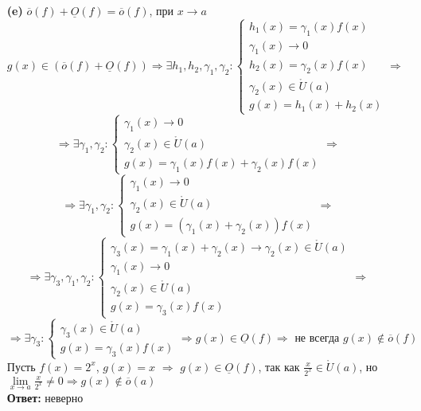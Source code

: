 \documentclass[a4paper]{article}
\renewcommand{\f}[2]{\frac{#1}{#2}}
\newcommand{\case}[1]{\begin{cases} #1 \end{cases}}
\newcommand{\lm}[1]{\underset{#1}{\lim}}
\renewcommand{\r}{\Rightarrow}
\newcommand{\OO}{\underline{O}}
\newcommand{\oo}{\overline{o}}
\begin{document}
\begin{enumerate}
\begin{enumerate}
        \item[\textbf{(e)}]$\oo(f) + \OO(f) = \oo(f)$, при $x \to a$
        $$g(x) \in (\oo(f)+ \OO(f)) \r \exists h_1, h_2, \gamma_1, \gamma_2 : \case{
            h_1(x) = \gamma_1(x)f(x)\\
            \gamma_1(x) \to 0\\
            h_2(x) = \gamma_2(x)f(x)\\
            \gamma_2(x) \in \mathring{U}(a)\\
            g(x) = h_1(x)+h_2(x)
        }\r$$
        $$\r \exists \gamma_1, \gamma_2 : \case{
            \gamma_1(x) \to 0\\
            \gamma_2(x) \in \mathring{U}(a)\\
            g(x) = \gamma_1(x)f(x) + \gamma_2(x)f(x) 
        }\r $$
        $$ \r \exists \gamma_1, \gamma_2 : \case{
            \gamma_1(x) \to 0\\
            \gamma_2(x) \in \mathring{U}(a)\\
            g(x) = (\gamma_1(x) + \gamma_2(x))f(x)
        }\r$$
        $$ \r \exists \gamma_3,\gamma_1, \gamma_2 : \case{
            \gamma_3(x) = \gamma_1(x) + \gamma_2(x) \to \gamma_2(x) \in \mathring{U}(a)\\
            \gamma_1(x) \to 0\\
            \gamma_2(x) \in \mathring{U}(a)\\
            g(x) = \gamma_3(x)f(x)
        } \r$$
        $$\r \exists \gamma_3 : \case{
            \gamma_3(x) \in \mathring{U}(a)\\
            g(x) = \gamma_3(x)f(x)
        } \r g(x) \in \OO(f) \r \text{ не всегда } g(x) \notin \oo(f)$$
        Пусть $f(x) = 2^x$, $g(x) = x$ $\r$ $g(x) \in \OO(f)$, так как $\f{x}{2^x} \in \mathring{U}(a)$, но $\lm{x \to a}\f{x}{2^x} \neq 0 \r g(x) \notin \oo(a)$\\
        \textbf{Ответ: } неверно


\end{enumerate}
\end{enumerate}
\end{document}
